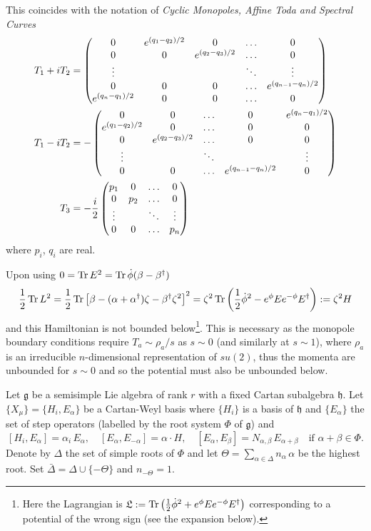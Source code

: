 \documentclass{article}
\begin{document}
This coincides with the notation of \emph{Cyclic Monopoles, Affine Toda and Spectral Curves}
\cite{Braden2011}
\begin{align}
T_1+iT_2&=\begin{pmatrix} 0&e\sp{(q_1-q_2)/2}&0&\ldots&0\\
0&0&e\sp{(q_2-q_3)/2}&\ldots&0\\
\vdots&&&\ddots&\vdots\\
0&0&0&\ldots&e\sp{(q_{n-1}-q_n)/2}\\
e\sp{(q_n-q_1)/2}&0&0&\ldots&0
\end{pmatrix}\\
T_1-iT_2&=-\begin{pmatrix}0&0&\ldots&0&e\sp{(q_n-q_1)/2}\\
e\sp{(q_1-q_2)/2}&0&\ldots&0&0\\
0&e\sp{(q_2-q_3)/2}&\ldots&0&0\\
\vdots&&\ddots&&\vdots\\
0&0&\ldots&e\sp{(q_{n-1}-q_n)/2}&0
\end{pmatrix}\\
T_3&=-\frac{i}{2}\begin{pmatrix} p_1&0&\ldots&0\\
0&p_2&\ldots&0\\
\vdots&&\ddots&\vdots\\
0&0&\ldots&p_n
\end{pmatrix}
\end{align}
where $p_i$, $q_i$ are real. 

Upon using $0=\operatorname{Tr} E^2=\operatorname{Tr} \dot \phi(\beta-\beta\sp\dagger)$
$$\frac12\operatorname{Tr} L^2=\frac12\operatorname{Tr}\left[\beta -(\alpha+\alpha\sp\dagger)\zeta-\beta\sp\dagger \zeta^2\right]^2
=\zeta^2\operatorname{Tr}\left(\frac12 {\dot\phi}^2 -e^{\phi}E  e^{-\phi} E\sp\dagger \right):=\zeta^2 H
$$
and this Hamiltonian is not bounded below\footnote{Here the Lagrangian is
	$\mathfrak{L}:=\operatorname{Tr}\left(\frac12 {\dot\phi}^2 +e^{\phi}E  e^{-\phi} E\sp\dagger \right)$ corresponding to a potential of the wrong sign (see the expansion below).}. This is necessary as the monopole boundary conditions require $T_a\sim \rho_a/s $ as $s\sim 0$ (and similarly at $s\sim1$), where $\rho_a$
is an irreducible $n$-dimensional representation of $su(2)$, thus the momenta are unbounded for
$s\sim 0$ and so the potential must also be unbounded below.


Let $\mathfrak{g}$ be a semisimple Lie algebra of rank $r$ with a fixed Cartan subalgebra $\mathfrak{h}$.
Let $\{X_\mu\}=\{H_i, E_\alpha\}$ be a Cartan-Weyl basis where $\{H_i\}$ is a basis of $\mathfrak{h}$
and $\{E_\alpha\}$ the set of step operators (labelled by the root system $\Phi$ of $\mathfrak{g}$) and 
$$[H_i,E_\alpha]=\alpha_i\, E_\alpha,\quad [E_\alpha,E_{-\alpha}]=\alpha\cdot H,
\quad [E_\alpha, E_\beta]=N_{\alpha,\beta}\, E_{\alpha+\beta} \quad\text{if }\alpha+\beta\in \Phi.
$$
Denote by $\Delta$  the set of simple roots of $\Phi$  and let
$\Theta=\sum_{\alpha\in\Delta} {n_\alpha}\, \alpha$ be the highest root. Set 
$\bar\Delta=\Delta\cup\{-\Theta\}$ and $n_{-\Theta}=1$.
\end{document}
